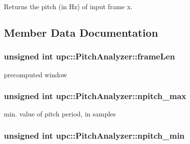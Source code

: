 Returns the pitch (in Hz) of input frame x. 



\subsection{Member Data Documentation}
\subsubsection[{\texorpdfstring{frame\+Len}{frameLen}}]{\setlength{\rightskip}{0pt plus 5cm}unsigned int upc\+::\+Pitch\+Analyzer\+::frame\+Len\hspace{0.3cm}{\ttfamily [private]}}\hypertarget{classupc_1_1PitchAnalyzer_a6ef737140140ec94f7be345804f28c73}{}\label{classupc_1_1PitchAnalyzer_a6ef737140140ec94f7be345804f28c73}


precomputed window 

\subsubsection[{\texorpdfstring{npitch\+\_\+max}{npitch_max}}]{\setlength{\rightskip}{0pt plus 5cm}unsigned int upc\+::\+Pitch\+Analyzer\+::npitch\+\_\+max\hspace{0.3cm}{\ttfamily [private]}}\hypertarget{classupc_1_1PitchAnalyzer_a63d4cf285fa5f7a4e579ac2e02d36dd2}{}\label{classupc_1_1PitchAnalyzer_a63d4cf285fa5f7a4e579ac2e02d36dd2}


min. value of pitch period, in samples 

\subsubsection[{\texorpdfstring{npitch\+\_\+min}{npitch_min}}]{\setlength{\rightskip}{0pt plus 5cm}unsigned int upc\+::\+Pitch\+Analyzer\+::npitch\+\_\+min\hspace{0.3cm}{\ttfamily [private]}}\hypertarget{classupc_1_1PitchAnalyzer_a3bb67370dbd69fade6be12fdae510eed}{}\label{classupc_1_1PitchAnalyzer_a3bb67370dbd69fade6be12fdae510eed}


